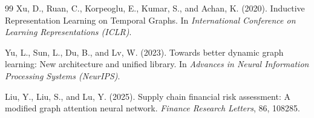 \documentclass[10pt]{article}
\begin{document}
\begin{thebibliography}{99}
 Xu, D., Ruan, C., Korpeoglu, E., Kumar, S., and Achan, K. (2020). Inductive Representation Learning on Temporal Graphs. In \emph{International Conference on Learning Representations (ICLR)}.

 Yu, L., Sun, L., Du, B., and Lv, W. (2023). Towards better dynamic graph learning: New architecture and unified library. In \emph{Advances in Neural Information Processing Systems (NeurIPS)}.

 Liu, Y., Liu, S., and Lu, Y. (2025). Supply chain financial risk assessment: A modified graph attention neural network. \emph{Finance Research Letters}, 86, 108285.

\end{thebibliography}
\end{document}
